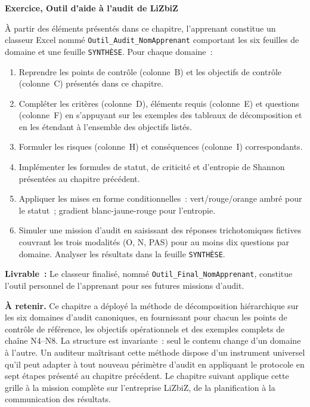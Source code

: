 \begin{boxexo}
\textbf{Exercice, Outil d'aide à l'audit de LiZbiZ}

À partir des éléments présentés dans ce chapitre, l'apprenant constitue un classeur Excel nommé \texttt{Outil\_Audit\_NomApprenant} comportant les six feuilles de domaine et une feuille \texttt{SYNTHÈSE}. Pour chaque domaine~:

\begin{enumerate}
    \item Reprendre les points de contrôle (colonne~B) et les objectifs de contrôle (colonne~C) présentés dans ce chapitre.
    \item Compléter les critères (colonne~D), éléments requis (colonne~E) et questions (colonne~F) en s'appuyant sur les exemples des tableaux de décomposition et en les étendant à l'ensemble des objectifs listés.
    \item Formuler les risques (colonne~H) et conséquences (colonne~I) correspondants.
    \item Implémenter les formules de statut, de criticité et d'entropie de Shannon présentées au chapitre précédent.
    \item Appliquer les mises en forme conditionnelles~: vert/rouge/orange ambré pour le statut~; gradient blanc-jaune-rouge pour l'entropie.
    \item Simuler une mission d'audit en saisissant des réponses trichotomiques fictives couvrant les trois modalités (O, N, PAS) pour au moins dix questions par domaine. Analyser les résultats dans la feuille \texttt{SYNTHÈSE}.
\end{enumerate}

\textbf{Livrable~:} Le classeur finalisé, nommé \texttt{Outil\_Final\_NomApprenant}, constitue l'outil personnel de l'apprenant pour ses futures missions d'audit.
\end{boxexo}

\begin{boxresume}
\textbf{À retenir.} Ce chapitre a déployé la méthode de décomposition hiérarchique sur les six domaines d'audit canoniques, en fournissant pour chacun les points de contrôle de référence, les objectifs opérationnels et des exemples complets de chaîne N4--N8. La structure est invariante~: seul le contenu change d'un domaine à l'autre. Un auditeur maîtrisant cette méthode dispose d'un instrument universel qu'il peut adapter à tout nouveau périmètre d'audit en appliquant le protocole en sept étapes présenté au chapitre précédent. Le chapitre suivant applique cette grille à la mission complète sur l'entreprise LiZbiZ, de la planification à la communication des résultats.
\end{boxresume}